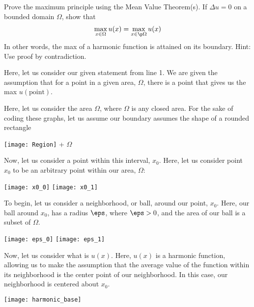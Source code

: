 \item Prove the maximum principle using the Mean Value Theorem(s). If $\Delta u = 0$ on a bounded domain $\Omega$, show that
%
\begin{align}
  \max_{x \in \Omega} u(x) = \max_{x \in \p \Omega} u(x)
\end{align}
In other words, the max of a harmonic function is attained on its boundary. Hint: Use proof by contradiction.
\bigbreak

Here, let us consider our given statement from line 1. We are given the assumption that for a point in a given area, $\Omega$, there is a point that gives us the max $u(\text{point})$.

Here, let us consider the area $\Omega$, where $\Omega$ is any closed area.
For the sake of coding these graphs, let us assume our boundary assumes the shape of a rounded rectangle %

\begin{center}
  \texttt{[image: Region]}
  + $\Omega$ %
\end{center}

Now, let us consider a point within this interval, $x_0$. Here, let us consider point $x_0$ to be an arbitrary point within our area, $\Omega$:

\begin{center}
  \texttt{[image: x0\_0]}
  \texttt{[image: x0\_1]}
\end{center}

To begin, let us consider a neighborhood, or ball, around our point, $x_0$. Here, our ball around $x_0$, has a radius $\eps$, where $\eps > 0$, and the area of our ball is a subset of $\Omega$.

\begin{center}
  \texttt{[image: eps\_0]}
  \texttt{[image: eps\_1]}
\end{center}

Now, let us consider what is $u(x)$. Here, $u(x)$ is a harmonic function,
allowing us to make the assumption that the average value of the function
within its neighborhood is the center point of our neighborhood. In this case,
our neighborhood is centered about $x_0$.

\begin{center}
  \texttt{[image: harmonic\_base]}
\end{center}

